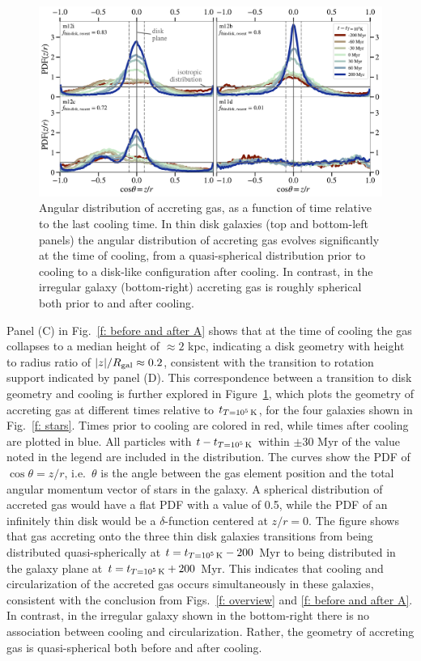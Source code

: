 \documentclass[fleqn,usenatbib]{mnras}
\newcommand{\tcon}{t_{T=10^5\,{\rm K}}}
\begin{document}
\begin{figure}
    \centering
    \includegraphics[width=\textwidth]{figures/theta_vs_t.pdf}
    \caption{
    Angular distribution of accreting gas, as a function of time relative to the last cooling time.
    In thin disk galaxies (top and bottom-left panels) the angular distribution of accreting gas evolves significantly at the time of cooling, from a quasi-spherical distribution prior to cooling to a disk-like configuration after cooling. 
    In contrast, in the irregular galaxy (bottom-right) accreting gas is roughly spherical both prior to and after cooling.
    }
    \label{f: theta vs t}
\end{figure}

Panel (C) in Fig.~\ref{f: before and after A} shows that at the time of cooling the gas collapses to a median height of $\approx 2$ kpc, indicating a disk geometry with height to radius ratio of $\vert z\vert/R_{\rm gal}\approx0.2$, consistent with the transition to rotation support indicated by panel (D).
This correspondence between a transition to disk geometry and cooling is further explored in Figure~\ref{f: theta vs t}, which plots the geometry of accreting gas at different times relative to $\tcon$, for the four galaxies shown in Fig.~\ref{f: stars}. 
Times prior to cooling are colored in red, while times after cooling are plotted in blue.
All particles with $t-\tcon$ within $\pm$30 Myr of the value noted in the legend are included in the distribution. 
The curves show the PDF of $\cos \theta = z/r$, i.e.\ $\theta$ is the angle between the gas element position and the total angular momentum vector of stars in the galaxy.
A spherical distribution of accreted gas would have a flat PDF with a value of 0.5, while 
the PDF of an infinitely thin disk would be a $\delta$-function centered at $z/r = 0$.
The figure shows that gas accreting onto the three thin disk galaxies transitions from being distributed quasi-spherically at $t = \tcon-200$ Myr to being distributed in the galaxy plane at $t = \tcon+200$ Myr.
This indicates that cooling and circularization of the accreted gas occurs simultaneously in these galaxies, consistent with the conclusion from Figs.~\ref{f: overview} and \ref{f: before and after A}.
In contrast, in the irregular galaxy shown in the bottom-right there is no association between cooling and circularization.
Rather, the geometry of accreting gas is quasi-spherical both before and after cooling.
\end{document}

